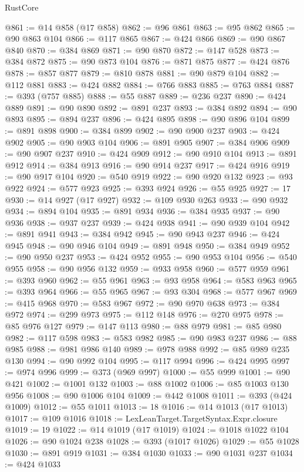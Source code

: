 \begin{lexlean}{RustCore}
\begin{coremodule}
@861 := @14 @858 (@17 @858)
@862 := @96 @861
@863 := @95 @862
@865 := @90 @863 @104
@866 := @117 @865
@867 := @424 @866
@869 := @90 @867 @840
@870 := @384 @869
@871 := @90 @870
@872 := @147 @528
@873 := @384 @872
@875 := @90 @873 @104
@876 := @871 @875
@877 := @424 @876
@878 := @857 @877
@879 := @810 @878
@881 := @90 @879 @104
@882 := @112 @881
@883 := @424 @882
@884 := @766 @883
@885 := @763 @884
@887 := @393 (@757 @885)
@888 := @55 @887
@889 := @236 @237
@890 := @424 @889
@891 := @90 @890
@892 := @891 @237
@893 := @384 @892
@894 := @90 @893
@895 := @894 @237
@896 := @424 @895
@898 := @90 @896 @104
@899 := @891 @898
@900 := @384 @899
@902 := @90 @900 @237
@903 := @424 @902
@905 := @90 @903 @104
@906 := @891 @905
@907 := @384 @906
@909 := @90 @907 @237
@910 := @424 @909
@912 := @90 @910 @104
@913 := @891 @912
@914 := @384 @913
@916 := @90 @914 @237
@917 := @424 @916
@919 := @90 @917 @104
@920 := @540 @919
@922 := @90 @920 @132
@923 := @93 @922
@924 := @577 @923
@925 := @393 @924
@926 := @55 @925
@927 := 17
@930 := @14 @927 (@17 @927)
@932 := @109 @930 @263
@933 := @90 @932
@934 := @894 @104
@935 := @891 @934
@936 := @384 @935
@937 := @90 @936
@938 := @937 @237
@939 := @424 @938
@941 := @90 @939 @104
@942 := @891 @941
@943 := @384 @942
@945 := @90 @943 @237
@946 := @424 @945
@948 := @90 @946 @104
@949 := @891 @948
@950 := @384 @949
@952 := @90 @950 @237
@953 := @424 @952
@955 := @90 @953 @104
@956 := @540 @955
@958 := @90 @956 @132
@959 := @933 @958
@960 := @577 @959
@961 := @393 @960
@962 := @55 @961
@963 := @93 @958
@964 := @583 @963
@965 := @393 @964
@966 := @55 @965
@967 := @93 @304
@968 := @577 @967
@969 := @415 @968
@970 := @583 @967
@972 := @90 @970 @638
@973 := @384 @972
@974 := @299 @973
@975 := @112 @148
@976 := @270 @975
@978 := @85 @976 @127
@979 := @147 @113
@980 := @88 @979
@981 := @85 @980
@982 := @117 @598
@983 := @583 @982
@985 := @90 @983 @237
@986 := @88 @985
@988 := @981 @986 @140
@989 := @978 @988
@992 := @85 @989 @235 @130
@994 := @90 @992 @104
@995 := @117 @994
@996 := @424 @995
@997 := @974 @996
@999 := @373 (@969 @997)
@1000 := @55 @999
@1001 := @90 @421
@1002 := @1001 @132
@1003 := @88 @1002
@1006 := @85 @1003 @130 @956
@1008 := @90 @1006 @104
@1009 := @442 @1008
@1011 := @393 (@424 @1009)
@1012 := @55 @1011
@1013 := 18
@1016 := @14 @1013 (@17 @1013)
@1017 := @109 @1016
@1018 := LexLeanTarget.TargetSyntax.Expr.closure
@1019 := 19
@1022 := @14 @1019 (@17 @1019)
@1024 := @1018 @1022 @104
@1026 := @90 @1024 @238
@1028 := @393 (@1017 @1026)
@1029 := @55 @1028
@1030 := @891 @919
@1031 := @384 @1030
@1033 := @90 @1031 @237
@1034 := @424 @1033

\end{coremodule}
\end{lexlean}
